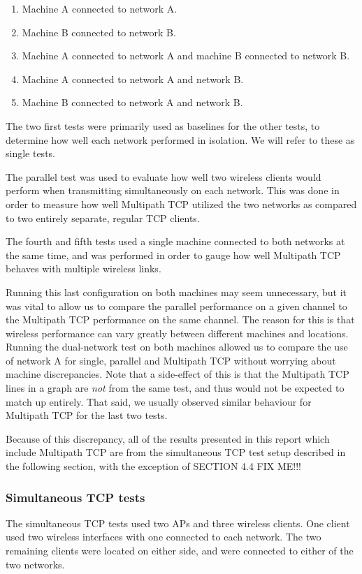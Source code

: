 \begin{enumerate}
  \item Machine A connected to network A.
  \item Machine B connected to network B.
  \item Machine A connected to network A and machine B connected to network B.
  \item Machine A connected to network A and network B.
  \item Machine B connected to network A and network B.
\end{enumerate}

The two first tests were primarily used as baselines for the other tests, to determine
how well each network performed in isolation. We will refer to these as single tests.

The parallel test was used to evaluate how well two wireless clients would perform
when transmitting simultaneously on each network. This was done in order to
measure how well Multipath TCP utilized the two networks as compared to two
entirely separate, regular TCP clients.

The fourth and fifth tests used a single machine connected to both networks at
the same time, and was performed in order to gauge how well Multipath TCP behaves
with multiple wireless links.

Running this last configuration on both machines may seem unnecessary,
but it was vital to allow us to compare the parallel performance on a
given channel to the Multipath TCP performance on the same channel. The reason
for this is that wireless performance can vary greatly between different machines and
locations. Running the dual-network test on both machines allowed us to compare
the use of network A for single, parallel and Multipath TCP without worrying
about machine discrepancies. Note that a side-effect of this is that the
Multipath TCP lines in a graph are \emph{not} from the same test, and thus
would not be expected to match up entirely. That said, we usually observed
similar behaviour for Multipath TCP for the last two tests.

Because of this discrepancy, all of the results presented in this report which
include Multipath TCP are
from the simultaneous TCP test setup described in the following section, with
the exception of SECTION 4.4 FIX ME!!!

\subsubsection{Simultaneous TCP tests}
\label{sec:met:setups:simtcp}
The simultaneous TCP tests used two APs and three
wireless clients. One client used two wireless interfaces with one
connected to each network. The two remaining clients were located on either side, and were connected to either of the two networks.

